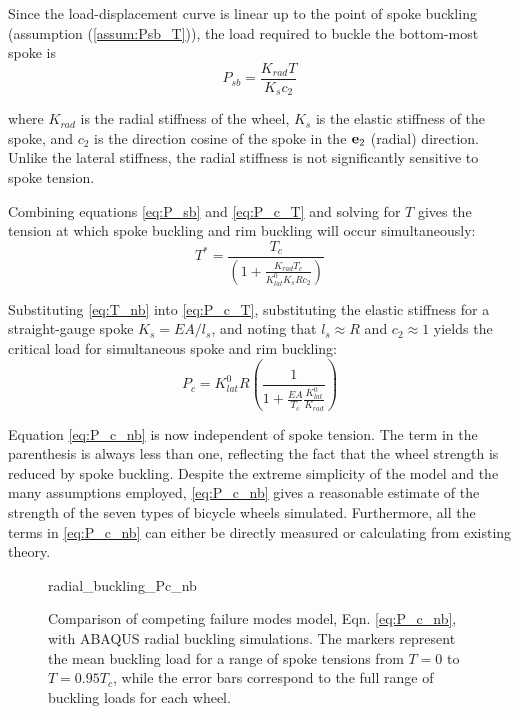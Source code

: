 \documentclass[\rootdir/thesis.tex]{subfiles}
\begin{document}
Since the load-displacement curve is linear up to the point of spoke buckling (assumption (\ref{assum:Psb_T})), the load required to buckle the bottom-most spoke is
\begin{equation}
\label{eq:P_sb}
P_{sb} = \frac{K_{rad}T}{K_s c_2}
\end{equation}

where $K_{rad}$ is the radial stiffness of the wheel, $K_s$ is the elastic stiffness of the spoke, and $c_2$ is the direction cosine of the spoke in the $\mathbf{e}_2$ (radial) direction. Unlike the lateral stiffness, the radial stiffness is not significantly sensitive to spoke tension.

Combining equations \eqref{eq:P_sb} and \eqref{eq:P_c_T} and solving for $T$ gives the tension at which spoke buckling and rim buckling will occur simultaneously:
\begin{equation}
\label{eq:T_nb}
T^* = \frac{T_c}{\left(1 + \frac{K_{rad}T_c}{K_{lat}^0 K_s R c_2}\right)}
\end{equation}

Substituting \eqref{eq:T_nb} into \eqref{eq:P_c_T}, substituting the elastic stiffness for a straight-gauge spoke $K_s=EA/l_s$, and noting that $l_s \approx R$ and $c_2\approx 1$ yields the critical load for simultaneous spoke and rim buckling:
\begin{equation}
\label{eq:P_c_nb}
P_c = K_{lat}^0 R \left(\frac{1}{1 + \frac{EA}
						{T_c}\frac{K_{lat}^0}{K_{rad}}}\right)
\end{equation}

Equation \eqref{eq:P_c_nb} is now independent of spoke tension. The term in the parenthesis is always less than one, reflecting the fact that the wheel strength is reduced by spoke buckling. Despite the extreme simplicity of the model and the many assumptions employed, \eqref{eq:P_c_nb} gives a reasonable estimate of the strength of the seven types of bicycle wheels simulated. Furthermore, all the terms in \eqref{eq:P_c_nb} can either be directly measured or calculating from existing theory.

\begin{figure}[h]
\centering
{radial_buckling_Pc_nb}
\caption{Comparison of competing failure modes model, Eqn. \eqref{eq:P_c_nb}, with ABAQUS radial buckling simulations. The markers represent the mean buckling load for a range of spoke tensions from $T=0$ to $T=0.95T_c$, while the error bars correspond to the full range of buckling loads for each wheel.}
\end{figure}
\end{document}
